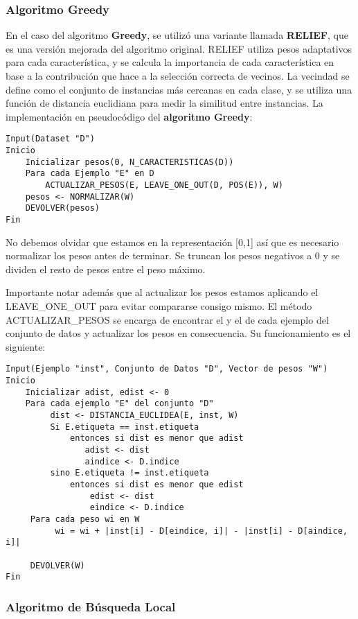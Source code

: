 \subsubsection{Algoritmo Greedy}

En el caso del algoritmo \textbf{Greedy}, se utilizó una variante llamada \textbf{RELIEF}, que es una versión mejorada del algoritmo original. RELIEF utiliza pesos adaptativos para cada característica, y se calcula la importancia de cada característica en base a la contribución que hace a la selección correcta de vecinos. La vecindad se define como el conjunto de instancias más cercanas en cada clase, y se utiliza una función de distancia euclidiana para medir la similitud entre instancias. La implementación en pseudocódigo del \textbf{algoritmo Greedy}:
\begin{verbatim}
Input(Dataset "D")
Inicio
    Inicializar pesos(0, N_CARACTERISTICAS(D))
    Para cada Ejemplo "E" en D
        ACTUALIZAR_PESOS(E, LEAVE_ONE_OUT(D, POS(E)), W)
    pesos <- NORMALIZAR(W)
    DEVOLVER(pesos)
Fin
\end{verbatim}
No debemos olvidar que estamos en la representación [0,1] así que es necesario normalizar los pesos antes de terminar. Se truncan los pesos negativos a 0 y se dividen el resto de pesos entre el peso máximo.

Importante notar además que al actualizar los pesos estamos aplicando el LEAVE\_ONE\_OUT para evitar compararse consigo mismo. El método ACTUALIZAR\_PESOS se encarga de encontrar el  y el  de cada ejemplo del conjunto de datos y actualizar los pesos en consecuencia. Su funcionamiento es el siguiente:

\begin{verbatim}
Input(Ejemplo "inst", Conjunto de Datos "D", Vector de pesos "W")
Inicio
    Inicializar adist, edist <- 0
    Para cada ejemplo "E" del conjunto "D"
         dist <- DISTANCIA_EUCLIDEA(E, inst, W)
         Si E.etiqueta == inst.etiqueta
             entonces si dist es menor que adist
             	adist <- dist
             	aindice <- D.indice
         sino E.etiqueta != inst.etiqueta
             entonces si dist es menor que edist
                 edist <- dist
                 eindice <- D.indice
     Para cada peso wi en W
          wi = wi + |inst[i] - D[eindice, i]| - |inst[i] - D[aindice, i]|
          
     DEVOLVER(W)
Fin
\end{verbatim}

\subsubsection{Algoritmo de Búsqueda Local}

